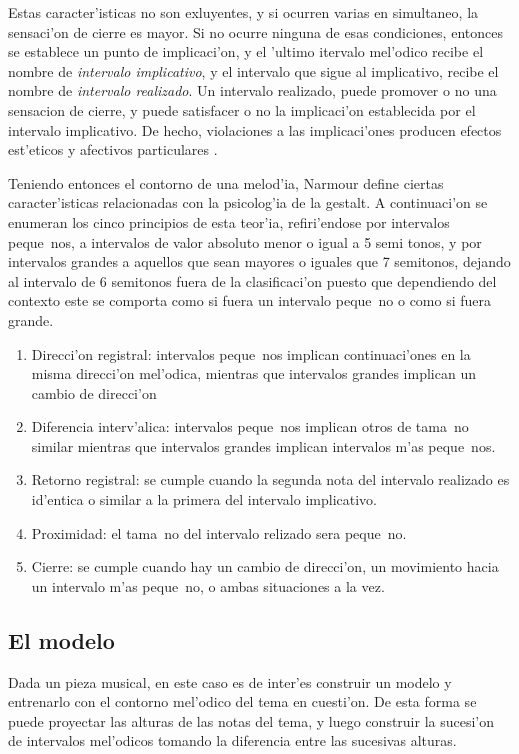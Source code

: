 Estas caracter'isticas no son exluyentes, y si ocurren varias en simultaneo, la sensaci'on de cierre es mayor. 
Si no ocurre ninguna de esas condiciones, entonces se establece un punto de implicaci'on, y el 'ultimo itervalo mel'odico recibe el nombre
de \emph{intervalo implicativo}, y el intervalo que sigue al implicativo, recibe el nombre de \emph{intervalo realizado}. 
Un intervalo realizado, puede promover o no una sensacion de cierre, y puede satisfacer o no la implicaci'on establecida por el intervalo 
implicativo. De hecho, violaciones a las implicaci'ones producen efectos est'eticos y afectivos particulares \citep{Narmour91}.
 
Teniendo entonces el contorno de una melod'ia, Narmour define ciertas caracter'isticas relacionadas con la psicolog'ia de la gestalt. A continuaci'on 
se enumeran los cinco principios de esta teor'ia, refiri'endose por intervalos peque~nos, a intervalos de valor absoluto menor o igual a 5 semi tonos, y por intervalos
grandes a aquellos que sean mayores o iguales que 7 semitonos, dejando al intervalo de 6 semitonos fuera de la clasificaci'on puesto que dependiendo del contexto
este se comporta como si fuera un intervalo peque~no o como si fuera grande.
\begin{enumerate}
 \item Direcci'on registral: intervalos peque~nos implican continuaci'ones en la misma direcci'on mel'odica, mientras que intervalos grandes implican un cambio de direcci'on
 \item Diferencia interv'alica: intervalos peque~nos implican otros de tama~no similar mientras que intervalos grandes implican intervalos m'as peque~nos. 
 \item Retorno registral: se cumple cuando la segunda nota del intervalo realizado es id'entica o similar a la primera del intervalo implicativo.
 \item Proximidad: el tama~no del intervalo relizado sera peque~no.
 \item Cierre: se cumple cuando hay un cambio de direcci'on, un movimiento hacia un intervalo m'as peque~no, o ambas situaciones a la vez.
\end{enumerate}

\subsection{El modelo}
\label{sec:contour_model}
Dada un pieza musical, en este caso es de inter'es construir un modelo y entrenarlo con el contorno mel'odico del tema en cuesti'on. De esta forma se puede proyectar
las alturas de las notas del tema, y luego construir la sucesi'on de intervalos mel'odicos tomando la diferencia entre las sucesivas alturas. 

